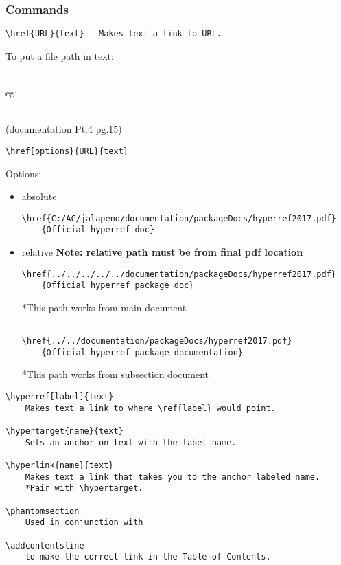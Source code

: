 \documentclass[class=article, crop=false, titlepage, twoside, multi={itemize, figure, verbatim}, float=false]{standalone}
\begin{document}
\subsubsection[Commands]{\Large Commands}
\begin{verbatim}
\href{URL}{text} — Makes text a link to URL.
\end{verbatim}

\begin{Large}To put a file path in text:\end{Large}\\
eg:\\

\\

\begin{tiny}(documentation Pt.4 pg.15)\end{tiny}
\begin{verbatim}
\href[options}{URL}{text}
\end{verbatim}

Options:\begin{itemize}
\item absolute
\begin{footnotesize}
\begin{verbatim}
\href{C:/AC/jalapeno/documentation/packageDocs/hyperref2017.pdf}
    {Official hyperref doc}
\end{verbatim}
\end{footnotesize}

\item relative \textbf{Note: relative path must be from final pdf location}
\begin{footnotesize}
\begin{verbatim}
\href{../../../../../documentation/packageDocs/hyperref2017.pdf}
    {Official hyperref package doc}
\end{verbatim}
*This path works from main document
\begin{verbatim}

\href{../../documentation/packageDocs/hyperref2017.pdf}
    {Official hyperref package documentation}
\end{verbatim}
*This path works from subsection document

\end{footnotesize}

\end{itemize}

\begin{verbatim}
\hyperref[label]{text} 
    Makes text a link to where \ref{label} would point.
  
\hypertarget{name}{text}
    Sets an anchor on text with the label name.
     
\hyperlink{name}{text} 
    Makes text a link that takes you to the anchor labeled name.     
    *Pair with \hypertarget.
 
\phantomsection
    Used in conjunction with

\addcontentsline 
    to make the correct link in the Table of Contents.
\end{verbatim}				
\end{document}
